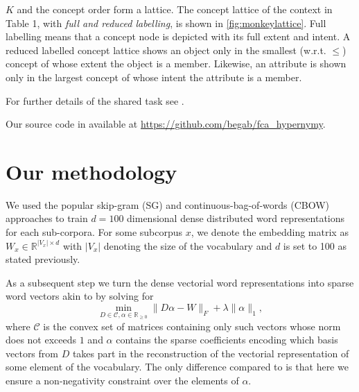 \documentclass[11pt,a4paper]{article}
\begin{document}
$K$ and the concept order form a %
lattice.  The concept lattice of the context in Table 1, with \emph{full and reduced
labelling}, is shown in \ref{fig:monkeylattice}.
Full labelling means that a concept node is depicted with its full extent and
intent. A reduced labelled concept lattice shows an object only in the smallest
(w.r.t. $\le$) concept of whose extent the object is a member.
Likewise, an attribute is shown only in the largest concept of whose intent the
attribute is a member.%

For further details of the shared task see
\cite{semeval2018task9}.

Our source code in available at \url{https://github.com/begab/fca_hypernymy}.


\section{Our methodology}
We used the popular skip-gram (SG) and continuous-bag-of-words (CBOW) approaches \cite{Mikolov:2013f} to train $d=100$ dimensional dense distributed word representations for each sub-corpora. For some subcorpus $x$, we denote the embedding matrix as $W_x \in \mathbb{R}^{\lvert V_x \rvert \times d}$ with $\lvert V_x \rvert$ denoting the size of the vocabulary and $d$ is set to 100 as stated previously.

As a subsequent step we turn the dense vectorial word representations into sparse word vectors akin to \citet{TACL1063} by solving for
\begin{equation}
\min\limits_{D \in \mathcal{C}, \alpha \in \mathbb{R}_{\geq0}} \lVert D\alpha - W \rVert_F + \lambda \lVert \alpha \rVert_1,
\label{nonneg_SPAMS_objective}
\end{equation}
where $\mathcal{C}$ is the convex set of matrices containing only such vectors whose norm does not exceeds $1$ and $\alpha$ contains the sparse coefficients encoding which basis vectors from $D$ takes part in the reconstruction of the vectorial representation of some element of the vocabulary. The only difference compared to \cite{TACL1063} is that here we ensure a non-negativity constraint over the elements of $\alpha$.
\end{document}
